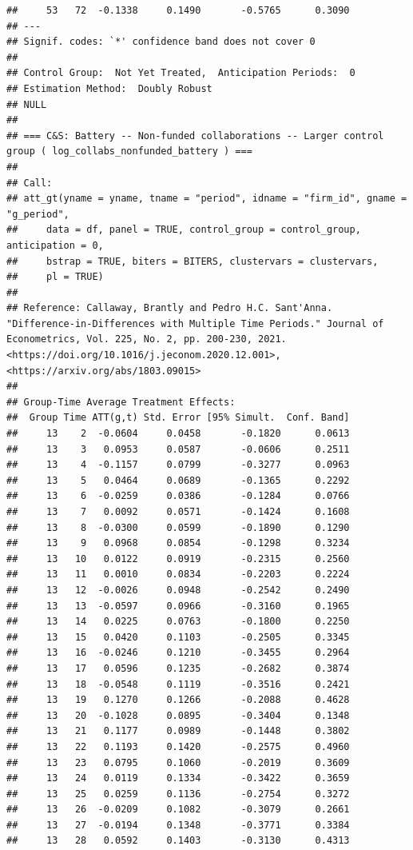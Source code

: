 \documentclass[
]{article}
\begin{document}
\begin{verbatim}
##     53   72  -0.1338     0.1490       -0.5765      0.3090  
## ---
## Signif. codes: `*' confidence band does not cover 0
## 
## Control Group:  Not Yet Treated,  Anticipation Periods:  0
## Estimation Method:  Doubly Robust
## NULL
## 
## === C&S: Battery -- Non-funded collaborations -- Larger control group ( log_collabs_nonfunded_battery ) ===
## 
## Call:
## att_gt(yname = yname, tname = "period", idname = "firm_id", gname = "g_period", 
##     data = df, panel = TRUE, control_group = control_group, anticipation = 0, 
##     bstrap = TRUE, biters = BITERS, clustervars = clustervars, 
##     pl = TRUE)
## 
## Reference: Callaway, Brantly and Pedro H.C. Sant'Anna.  "Difference-in-Differences with Multiple Time Periods." Journal of Econometrics, Vol. 225, No. 2, pp. 200-230, 2021. <https://doi.org/10.1016/j.jeconom.2020.12.001>, <https://arxiv.org/abs/1803.09015> 
## 
## Group-Time Average Treatment Effects:
##  Group Time ATT(g,t) Std. Error [95% Simult.  Conf. Band] 
##     13    2  -0.0604     0.0458       -0.1820      0.0613 
##     13    3   0.0953     0.0587       -0.0606      0.2511 
##     13    4  -0.1157     0.0799       -0.3277      0.0963 
##     13    5   0.0464     0.0689       -0.1365      0.2292 
##     13    6  -0.0259     0.0386       -0.1284      0.0766 
##     13    7   0.0092     0.0571       -0.1424      0.1608 
##     13    8  -0.0300     0.0599       -0.1890      0.1290 
##     13    9   0.0968     0.0854       -0.1298      0.3234 
##     13   10   0.0122     0.0919       -0.2315      0.2560 
##     13   11   0.0010     0.0834       -0.2203      0.2224 
##     13   12  -0.0026     0.0948       -0.2542      0.2490 
##     13   13  -0.0597     0.0966       -0.3160      0.1965 
##     13   14   0.0225     0.0763       -0.1800      0.2250 
##     13   15   0.0420     0.1103       -0.2505      0.3345 
##     13   16  -0.0246     0.1210       -0.3455      0.2964 
##     13   17   0.0596     0.1235       -0.2682      0.3874 
##     13   18  -0.0548     0.1119       -0.3516      0.2421 
##     13   19   0.1270     0.1266       -0.2088      0.4628 
##     13   20  -0.1028     0.0895       -0.3404      0.1348 
##     13   21   0.1177     0.0989       -0.1448      0.3802 
##     13   22   0.1193     0.1420       -0.2575      0.4960 
##     13   23   0.0795     0.1060       -0.2019      0.3609 
##     13   24   0.0119     0.1334       -0.3422      0.3659 
##     13   25   0.0259     0.1136       -0.2754      0.3272 
##     13   26  -0.0209     0.1082       -0.3079      0.2661 
##     13   27  -0.0194     0.1348       -0.3771      0.3384 
##     13   28   0.0592     0.1403       -0.3130      0.4313 

\end{verbatim}
\end{document}
